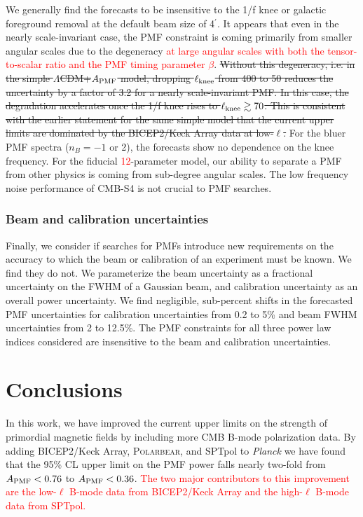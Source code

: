 \documentclass[apj]{emulateapj}
\newcommand{\apmf}{\ensuremath{A_{\rm PMF}}}
\newcommand{\lcdm}{\ensuremath{\Lambda}CDM}
\newcommand{\lknee}{\ensuremath{\ell_{\rm knee}}}
\newcommand{\planck}{{\sl Planck}}
\newcommand{\bicepkeck}{BICEP2/Keck Array}
\newcommand{\pb}{\textsc{Polarbear}}
\newcommand{\sptpol}{SPTpol}
\newcommand{\changed}[1]{\textcolor{Red}{#1}}
\begin{document}
We generally find the forecasts to be insensitive to the 1/f knee or galactic foreground removal at the default beam size of 4$^\prime$. 
It appears that even in the nearly scale-invariant case, the PMF constraint is coming primarily from smaller angular scales due to the degeneracy \changed{at large angular scales with both the tensor-to-scalar ratio and the PMF timing parameter $\beta$}. 
\st{Without this degeneracy, i.e. in the simple \lcdm{}+\apmf{} model, dropping \lknee{} from 400 to 50 reduces the uncertainty by a factor of 3.2 for a nearly scale-invariant PMF. 
In this case, the degradation accelerates once the 1/f knee rises to $\lknee{} \gtrsim 70$. 
This is consistent with the earlier statement for the same simple model that the current upper limits are dominated by the BICEP2/Keck Array data at low-$\ell$. }
For the bluer PMF spectra ($n_B=-1$ or 2), the forecasts show no dependence on the knee frequency. 
For the fiducial \changed{12}-parameter model, our ability to separate a PMF from other physics is coming from sub-degree angular scales. 
The low frequency noise performance of CMB-S4 is not crucial to PMF searches. 


\subsubsection{Beam and calibration uncertainties}
\label{subsec:beamcal}

Finally, we consider if searches for PMFs introduce new requirements on the accuracy to which the beam or  calibration of an experiment must be known. 
We find they do not. 
We parameterize the beam uncertainty as a fractional uncertainty on the FWHM of a Gaussian beam, and calibration uncertainty as an overall power uncertainty. 
We find negligible, sub-percent shifts in the forecasted PMF uncertainties for calibration uncertainties from 0.2 to 5\% and beam FWHM uncertainties from 2 to 12.5\%. 
The PMF constraints  for all three power law indices considered are insensitive to the beam and calibration uncertainties. 

\section{Conclusions}
\label{sec:conclusions}

In this work, we have improved the current upper limits on the strength of   primordial magnetic fields by including more CMB B-mode polarization data. 
By adding \bicepkeck{}, \pb, and \sptpol{} to \planck{} we have found that the 95\% CL upper limit on the PMF power falls nearly two-fold from $\apmf < \upperAplk$ to $\apmf < \upperAall$. 
\changed{The two major contributors to this improvement are the low-$\ell$ B-mode data from \bicepkeck{} and the high-$\ell$ B-mode data from \sptpol. }
\end{document}
